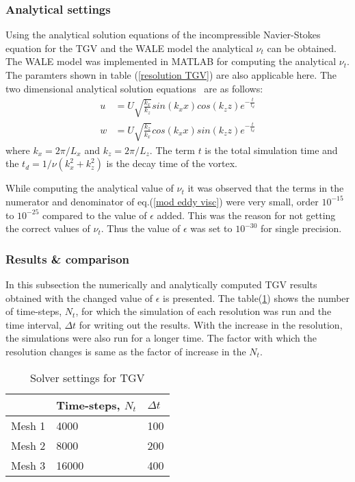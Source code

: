 \subsubsection{Analytical settings}
Using the analytical solution equations of the incompressible Navier-Stokes equation for the TGV and the WALE model the analytical $\nu_t$ can be obtained. The WALE model was implemented in MATLAB for computing the analytical $\nu_t$. The paramters shown in table (\ref{resolution TGV}) are also applicable here. The two dimensional analytical solution equations~\cite{krueger:book} are as follows:
%
\begin{equation}
\label{analytical sol}
\begin{split}
u &= U \sqrt{\frac{k_x}{k_z}}sin\left(k_xx\right)cos\left(k_zz\right)e^{-\frac{t}{t_d}}\\
w &= U \sqrt{\frac{k_z}{k_x}}cos\left(k_xx\right)sin\left(k_zz\right)e^{-\frac{t}{t_d}}\end{split}
\end{equation}
%
where $k_x = 2\pi/L_x$ and $k_z = 2\pi/L_z$. The term $t$ is the total simulation time and the $t_d = 1/\nu\left(k_x^2 + k_z^2\right)$ is the decay time of the vortex.

While computing the analytical value of $\nu_t$ it was observed that the terms in the numerator and denominator of eq.(\ref{mod eddy visc}) were very small, order $10^{-15}$ to $10^{-25}$ compared to the value of $\epsilon$ added. This was the reason for not getting the correct values of $\nu_t$. Thus the value of $\epsilon$ was set to $10^{-30}$ for single precision.

\subsubsection{Results \& comparison}

In this subsection the numerically and analytically computed TGV results obtained with the changed value of $\epsilon$ is presented. The table(\ref{solver TGV}) shows the number of time-steps, $N_t$, for which the simulation of each resolution was run and the time interval, $\Delta t$ for writing out the results. With the increase in the resolution, the simulations were also run for a longer time. The factor with which the resolution changes is same as the factor of increase in the $N_t$.

%
\begin{table}[h!]
\begin{center}
\begin{tabular}{ p{1.5cm}|p{2.5cm}|p{1cm}} 

 & Time-steps, $N_t$ & $\Delta t$\\
  \hline
   Mesh 1& 4000 & 100\\
  \hline
  Mesh 2& 8000& 200\\
  \hline
  Mesh 3 & 16000 & 400\\
  \hline
\end{tabular}
\end{center}
\caption{Solver settings for TGV}
\label{solver TGV}
\end{table}
%

%
\begin{figure}[h]
\begin{minipage}[b]{0.5\textwidth}
\end{minipage}
\end{figure}
%
